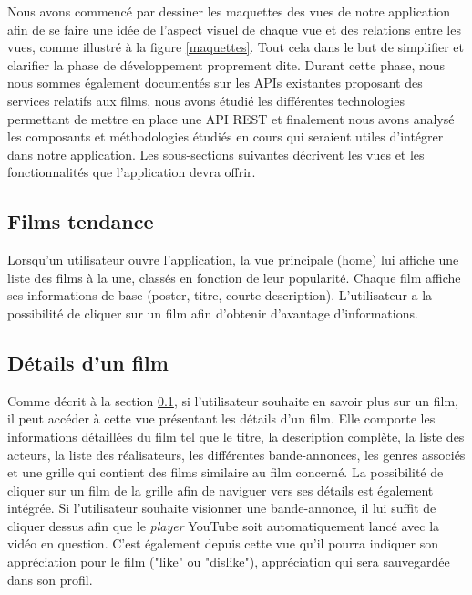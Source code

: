 Nous avons commencé par dessiner les maquettes des vues de notre application afin de se faire une idée de l'aspect visuel de chaque vue et des relations entre les vues, comme illustré à la figure \ref{maquettes}. Tout cela dans le but de simplifier et clarifier la phase de développement proprement dite.
Durant cette phase, nous nous sommes également documentés sur les APIs existantes proposant des services relatifs aux films, nous avons étudié les différentes technologies permettant de mettre en place une API REST et finalement nous avons analysé les composants et méthodologies étudiés en cours qui seraient utiles d'intégrer dans notre application.
Les sous-sections suivantes décrivent les vues et les fonctionnalités que l'application devra offrir.

\subsection{Films tendance}\label{films-tendance}
Lorsqu'un utilisateur ouvre l'application, la vue principale (home) lui affiche une liste des films à la une, classés en fonction de leur popularité. Chaque film affiche ses informations de base (poster, titre, courte description). L'utilisateur a la possibilité de cliquer sur un film afin d'obtenir d'avantage d'informations.

\subsection{Détails d'un film}
Comme décrit à la section \ref{films-tendance}, si l'utilisateur souhaite en savoir plus sur un film, il peut accéder à cette vue présentant les détails d'un film. Elle comporte les informations détaillées du film tel que le titre, la description complète, la liste des acteurs, la liste des réalisateurs, les différentes bande-annonces, les genres associés et une grille qui contient des films similaire au film concerné. La possibilité de cliquer sur un film de la grille afin de naviguer vers ses détails est également intégrée.
Si l'utilisateur souhaite visionner une bande-annonce, il lui suffit de cliquer dessus afin que le \textit{player} YouTube soit automatiquement lancé avec la vidéo en question.
C'est également depuis cette vue qu'il pourra indiquer son appréciation pour le film ("like" ou "dislike"), appréciation qui sera sauvegardée dans son profil.

